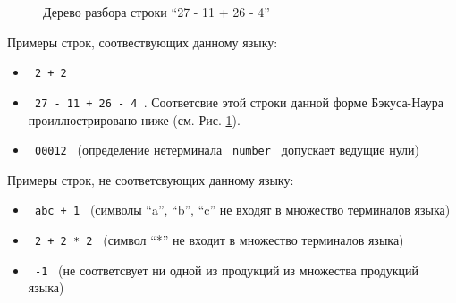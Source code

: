 \begin{figure}[ht]
\begin{center}
\caption{
\label{lit:bnf_ex_pic} Дерево разбора строки \enquote{27 - 11 + 26 - 4}
}
\end{center}
\end{figure}


Примеры строк, соотвествующих данному языку:
\begin{itemize}
    \item \texttt{ 2 + 2 }
    \item \texttt{ 27 - 11 + 26 - 4 }. Соответсвие этой строки данной форме Бэкуса-Наура проиллюстрировано ниже (см. Рис. \ref{lit:bnf_ex_pic}).
    \item \texttt{ 00012 } (определение нетерминала \texttt{ number } допускает ведущие нули)
\end{itemize}

Примеры строк, не соответсвующих данному языку:
\begin{itemize}
    \item \texttt{ abc + 1 } (символы \enquote{a}, \enquote{b}, \enquote{c} не входят в множество терминалов языка)
    \item \texttt{ 2 + 2 * 2 } (символ \enquote{*} не входит в множество терминалов языка)
    \item \texttt{ -1 } (не соответсвует ни одной из продукций из множества продукций языка)
\end{itemize}

